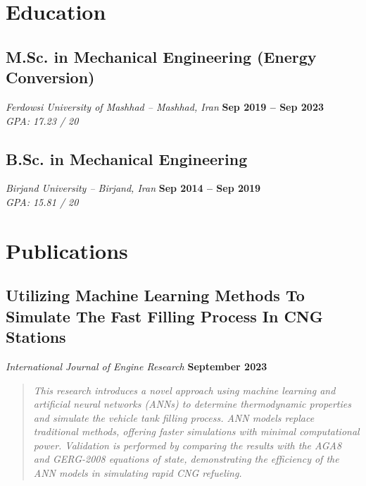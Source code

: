 \documentclass[10pt, a4paper]{article}
\begin{document}

\section{Education}
\subsection{M.Sc. in Mechanical Engineering (Energy Conversion)}
\textit{Ferdowsi University of Mashhad -- Mashhad, Iran} \hfill \textbf{Sep 2019 -- Sep 2023}
\\ \textit{GPA: 17.23 / 20}

\vspace{1em}

\subsection{B.Sc. in Mechanical Engineering}
\textit{Birjand University -- Birjand, Iran} \hfill \textbf{Sep 2014 -- Sep 2019}
\\ \textit{GPA: 15.81 / 20}


\section{Publications}
\subsection{Utilizing Machine Learning Methods To Simulate The Fast Filling Process In CNG Stations}
\textit{International Journal of Engine Research} \hfill \textbf{September 2023}
\begin{quote}
\small \itshape This research introduces a novel approach using machine learning and artificial neural networks (ANNs) to determine thermodynamic properties and simulate the vehicle tank filling process. ANN models replace traditional methods, offering faster simulations with minimal computational power. Validation is performed by comparing the results with the AGA8 and GERG-2008 equations of state, demonstrating the efficiency of the ANN models in simulating rapid CNG refueling.
\end{quote}
\end{document}
